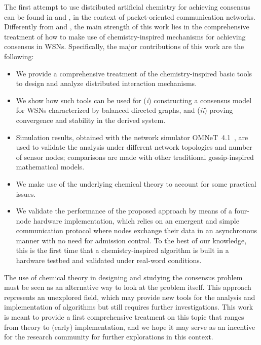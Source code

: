 \documentclass[journal]{IEEEtran}
\begin{document}
{The first attempt to use distributed artificial chemistry for achieving consensus can be found in \cite{MeTh} and \cite{MeTs09a}, in the context of packet-oriented communication networks. Differently from \cite{MeTh} and \cite{MeTs09a}, the main strength of this work lies in the comprehensive treatment of how to make use of chemistry-inspired mechanisms for achieving consensus in WSNs.
Specifically, the major contributions of this work are the following:
\begin{itemize}
\item We provide a comprehensive treatment of the chemistry-inspired basic tools to design and analyze distributed interaction mechanisms.
\item We show how such tools can be used for (\emph{i}) constructing a consensus model for WSNs characterized by balanced directed graphs, and (\emph{ii}) proving convergence and stability in the derived system. 
\item Simulation results, obtained with the network simulator OMNeT~4.1~\cite{VaHo08}, are used to validate the analysis under different network topologies and number of sensor nodes; comparisons are made with other traditional gossip-inspired mathematical models.
\item We make use of the underlying chemical theory to account for some practical issues. 
\item We validate the performance of the proposed approach by means of a four-node hardware implementation, which relies on an emergent and simple communication protocol where nodes exchange their data in an asynchronous manner with no need for admission control. To the best of our knowledge, this is the first time that a chemistry-inspired algorithm is built in a hardware testbed and validated under real-word conditions.\end{itemize}

{
The use of chemical theory in designing and studying the consensus problem must be seen as an alternative way to look at the problem itself. This approach represents an unexplored field, which may provide new tools for the analysis and implementation of algorithms but still requires further investigations. This work is meant to provide a first comprehensive treatment on this topic that ranges from theory to (early) implementation, and we hope it may serve as an incentive for the research community for further explorations in this context.
} 

}
\end{document}
